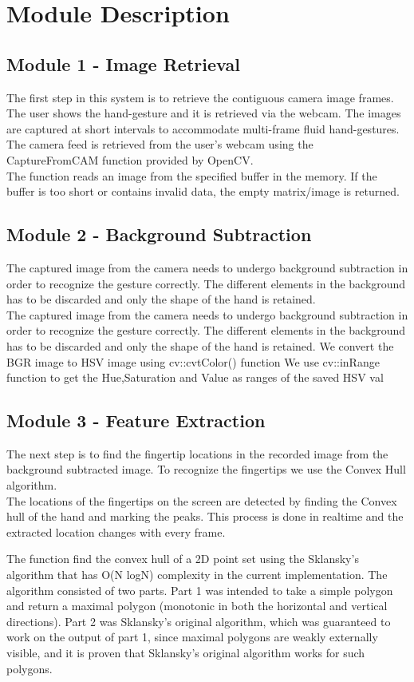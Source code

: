 \documentclass[11pt]{report}
\begin{document}
\section{Module Description}

\subsection{Module 1 - Image Retrieval}
The first step in this system is to retrieve the contiguous camera image frames. The user shows the hand-gesture 
and it is retrieved via the webcam. The images are captured at short intervals to accommodate multi-frame fluid hand-gestures.
\\
The camera feed is retrieved from the user's webcam using the CaptureFromCAM function provided by OpenCV.
\\
The function reads an image from the specified buffer in the memory. If the buffer is too short or contains invalid data, the empty matrix/image is returned.
\subsection{Module 2 - Background Subtraction}
The captured image from the camera needs to undergo background subtraction in order to recognize the gesture correctly. 
The different elements in the background has to be discarded and only the shape of the hand is retained. 
\\
The captured image from the camera needs to undergo background subtraction in order to recognize the gesture correctly. The different elements in the background has to be discarded and only the shape of the hand is retained.  
We convert the BGR image to HSV image using cv::cvtColor() function
We use cv::inRange function to get the Hue,Saturation and Value as ranges of the saved HSV val
\subsection{Module 3 - Feature Extraction}
The next step is to find the fingertip locations in the recorded image from the background subtracted image.
To recognize the fingertips we use the Convex Hull algorithm. 
\\
The locations of the fingertips on the screen are detected by finding the Convex hull of the 
hand and marking the peaks. This process is done in realtime and the extracted location changes
 with every frame. 
 
 The function find the convex hull of a 2D point set using the Sklansky’s algorithm
 that has O(N logN) complexity in the current implementation. The algorithm consisted of two parts. 
 Part 1 was intended to take a simple polygon and return a maximal polygon (monotonic in both the 
 horizontal and vertical directions). Part 2 was Sklansky's original algorithm, which
 was guaranteed to work on the output of part 1, since maximal polygons are weakly externally visible,
 and it is proven that Sklansky's original algorithm works for such polygons.
\end{document}
